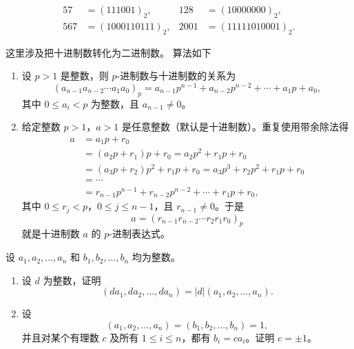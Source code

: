 \begin{solution}
	\[
	\begin{aligned}
		57&=(111001)_2, & 128&=(10000000)_2,\\
		567&=(1000110111)_2, & 2001&=(11111010001)_2.
	\end{aligned}
	\]
	

\end{solution}
这里涉及把十进制数转化为二进制数。
算法如下
\begin{enumerate}
	\item[(i)] 设 \(p>1\) 是整数，则 \(p\)-进制数与十进制数的关系为
	\[
	(a_{n-1}a_{n-2}\cdots a_1a_0)_p
	=a_{n-1}p^{n-1}+a_{n-2}p^{n-2}+\cdots+a_1p+a_0,
	\]
	其中 \(0\le a_i<p\) 为整数，且 \(a_{n-1}\ne0\)。
	
	\item[(ii)] 给定整数 \(p>1\)，\(a>1\) 是任意整数（默认是十进制数）。重复使用带余除法得
	\[
	\begin{aligned}
		a
		&=a_1p+r_0\\
		&=(a_2p+r_1)p+r_0
		=a_2p^2+r_1p+r_0\\
		&=(a_3p+r_2)p^2+r_1p+r_0
		=a_3p^3+r_2p^2+r_1p+r_0\\
		&=\cdots\\
		&=r_{n-1}p^{n-1}+r_{n-2}p^{n-2}+\cdots+r_1p+r_0,
	\end{aligned}
	\]
	其中 \(0\le r_j<p\)，\(0\le j\le n-1\)，且 \(r_{n-1}\ne0\)。于是
	\[
	a=(r_{n-1}r_{n-2}\cdots r_2r_1r_0)_p
	\]
	就是十进制数 \(a\) 的 \(p\)-进制表达式。
\end{enumerate}
\begin{problem}
设 \(a_1,a_2,\ldots,a_n\) 和 \(b_1,b_2,\ldots,b_n\) 均为整数。
	\begin{enumerate}
		\item 设 \(d\) 为整数，证明
		\[
		(da_1,da_2,\ldots,da_n)=|d|(a_1,a_2,\ldots,a_n).
		\]
		\item 设
		\[
		(a_1,a_2,\ldots,a_n)=(b_1,b_2,\ldots,b_n)=1,
		\]
		并且对某个有理数 \(c\) 及所有 \(1\le i\le n\)，都有 \(b_i=ca_i\)。证明 \(c=\pm1\)。
	\end{enumerate}
\end{problem}

